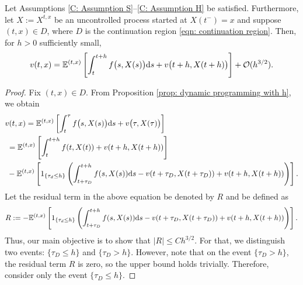 \begin{proposition}
\label{prop: small-h approximation}
    Let Assumptions \ref{C: Assumption S}--\ref{C: Assumption H} be satisfied. Furthermore, let $X:=X^{t,x}$ be an uncontrolled process started at $X(t^-)=x$ and suppose $(t,x) \in D$, where $D$ is the continuation region \eqref{eqn: continuation region}. Then, for $h>0$ sufficiently small, 
    \begin{equation*}
        v(t,x) = \mathbb{E}^{(t,x)} \left[ \int_t^{t+h} f\big(s,X(s)\big) \mathrm{d} s + v\big(t+h,X(t+h)\big) \right] + \mathcal{O}(h^{3/2}).
    \end{equation*}
\end{proposition}
\begin{proof}
    Fix $(t,x)\in D$. From Proposition \ref{prop: dynamic programming with h}, we obtain
    \begin{align*}
        & v(t,x) = \mathbb{E}^{(t,x)} \left[ \int_t^{\tau} f\big(s,X(s)\big)\mathrm{d} s + v\big(\tau,X(\tau)\big) \right] \\
        &\;= \mathbb{E}^{(t,x)} \left[\int_t^{t+h} f(t,X(t)) + v(t+h, X(t+h)) \right] \\
        & \; -\mathbb{E}^{(t,x)} \left[ 1_{\left\{\tau_d \leq h\right\}} \left(\int_{t+\tau_D}^{t+h}f(s,X(s)) \mathrm{d} s - v(t+\tau_D,X(t+\tau_D)) + v(t+h,X(t+h)) \right)\right].
    \end{align*} 
    Let the residual term in the above equation be denoted by $R$ and be defined as
    \begin{equation}
        R:=-\mathbb{E}^{(t,x)} \left[ 1_{\left\{\tau_d \leq h\right\}} \left(\int_{t+\tau_D}^{t+h}f(s,X(s)) \mathrm{d} s - v(t+\tau_D,X(t+\tau_D)) + v(t+h,X(t+h)) \right)\right].
        \label{C: residual term}
    \end{equation}
    Thus, our main objective is to show that $|R| \leq Ch^{3/2}$. For that, we distinguish two events: $\{\tau_D \leq h\}$ and $\{\tau_D > h\}$. However, note that on the event $\{\tau_D > h\}$, the residual term $R$ is zero, so the upper bound holds trivially. Therefore, consider only the event $\{\tau_D \leq h\}$. 


\end{proof}
